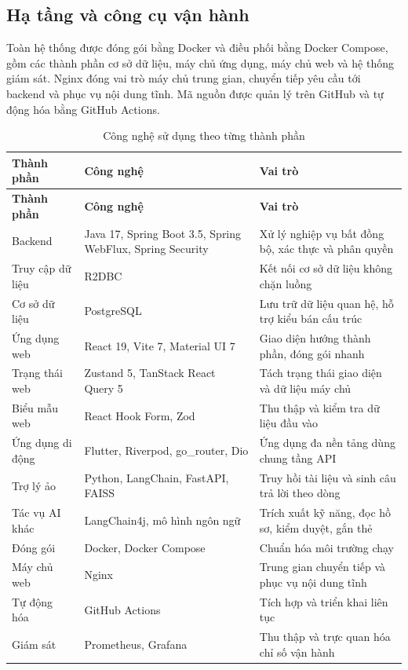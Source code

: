 \documentclass[12pt,a4paper,oneside]{report}
\begin{document}
\subsection{Hạ tầng và công cụ vận hành}

Toàn hệ thống được đóng gói bằng Docker và điều phối bằng Docker Compose, gồm các thành phần cơ sở dữ liệu, máy chủ ứng dụng, máy chủ web và hệ thống giám sát. Nginx đóng vai trò máy chủ trung gian, chuyển tiếp yêu cầu tới backend và phục vụ nội dung tĩnh. Mã nguồn được quản lý trên GitHub và tự động hóa bằng GitHub Actions.

\renewcommand{\arraystretch}{1.2}
\begin{longtable}{|>{\raggedright\arraybackslash}p{2.9cm}|>{\raggedright\arraybackslash}p{5.0cm}|>{\raggedright\arraybackslash}p{6.6cm}|}
\caption{Công nghệ sử dụng theo từng thành phần}\label{tab:tech}\\
\hline \textbf{Thành phần} & \textbf{Công nghệ} & \textbf{Vai trò} \\ \hline
\endfirsthead
\hline \textbf{Thành phần} & \textbf{Công nghệ} & \textbf{Vai trò} \\ \hline
\endhead
Backend & Java 17, Spring Boot 3.5, Spring WebFlux, Spring Security & Xử lý nghiệp vụ bất đồng bộ, xác thực và phân quyền \\ \hline
Truy cập dữ liệu & R2DBC & Kết nối cơ sở dữ liệu không chặn luồng \\ \hline
Cơ sở dữ liệu & PostgreSQL & Lưu trữ dữ liệu quan hệ, hỗ trợ kiểu bán cấu trúc \\ \hline
Ứng dụng web & React 19, Vite 7, Material UI 7 & Giao diện hướng thành phần, đóng gói nhanh \\ \hline
Trạng thái web & Zustand 5, TanStack React Query 5 & Tách trạng thái giao diện và dữ liệu máy chủ \\ \hline
Biểu mẫu web & React Hook Form, Zod & Thu thập và kiểm tra dữ liệu đầu vào \\ \hline
Ứng dụng di động & Flutter, Riverpod, go\_router, Dio & Ứng dụng đa nền tảng dùng chung tầng API \\ \hline
Trợ lý ảo & Python, LangChain, FastAPI, FAISS & Truy hồi tài liệu và sinh câu trả lời theo dòng \\ \hline
Tác vụ AI khác & LangChain4j, mô hình ngôn ngữ & Trích xuất kỹ năng, đọc hồ sơ, kiểm duyệt, gắn thẻ \\ \hline
Đóng gói & Docker, Docker Compose & Chuẩn hóa môi trường chạy \\ \hline
Máy chủ web & Nginx & Trung gian chuyển tiếp và phục vụ nội dung tĩnh \\ \hline
Tự động hóa & GitHub Actions & Tích hợp và triển khai liên tục \\ \hline
Giám sát & Prometheus, Grafana & Thu thập và trực quan hóa chỉ số vận hành \\ \hline
\end{longtable}
\renewcommand{\arraystretch}{1}
\end{document}
